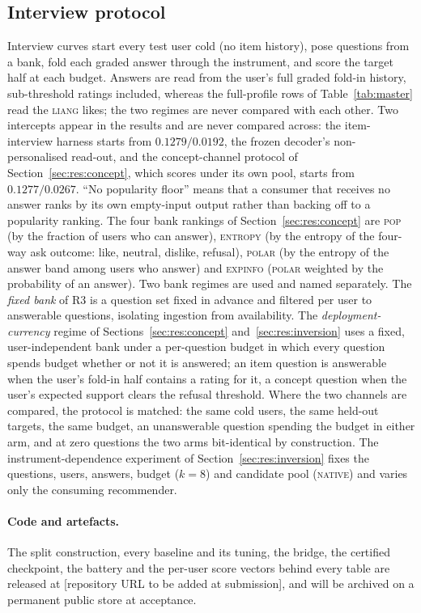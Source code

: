 \documentclass[manuscript,screen]{acmart}
\begin{document}
\subsection{Interview protocol}
Interview curves start every test user cold (no item history), pose questions from a bank, fold each graded answer through the instrument, and score the target half at each budget. Answers are read from the user's full graded fold-in history, sub-threshold ratings included, whereas the full-profile rows of Table~\ref{tab:master} read the \textsc{liang} likes; the two regimes are never compared with each other. Two intercepts appear in the results and are never compared across: the item-interview harness starts from $0.1279/0.0192$, the frozen decoder's non-personalised read-out, and the concept-channel protocol of Section~\ref{sec:res:concept}, which scores under its own pool, starts from $0.1277/0.0267$. ``No popularity floor'' means that a consumer that receives no answer ranks by its own empty-input output rather than backing off to a popularity ranking. The four bank rankings of Section~\ref{sec:res:concept} are \textsc{pop} (by the fraction of users who can answer), \textsc{entropy} (by the entropy of the four-way ask outcome: like, neutral, dislike, refusal), \textsc{polar} (by the entropy of the answer band among users who answer) and \textsc{expinfo} (\textsc{polar} weighted by the probability of an answer). Two bank regimes are used and named separately. The \emph{fixed bank} of R3 is a question set fixed in advance and filtered per user to answerable questions, isolating ingestion from availability. The \emph{deployment-currency} regime of Sections~\ref{sec:res:concept} and~\ref{sec:res:inversion} uses a fixed, user-independent bank under a per-question budget in which every question spends budget whether or not it is answered; an item question is answerable when the user's fold-in half contains a rating for it, a concept question when the user's expected support clears the refusal threshold. Where the two channels are compared, the protocol is matched: the same cold users, the same held-out targets, the same budget, an unanswerable question spending the budget in either arm, and at zero questions the two arms bit-identical by construction. The instrument-dependence experiment of Section~\ref{sec:res:inversion} fixes the questions, users, answers, budget ($k{=}8$) and candidate pool (\textsc{native}) and varies only the consuming recommender.

\paragraph{Code and artefacts.} The split construction, every baseline and its tuning, the bridge, the certified checkpoint, the battery and the per-user score vectors behind every table are released at [repository URL to be added at submission], and will be archived on a permanent public store at acceptance.
\end{document}
